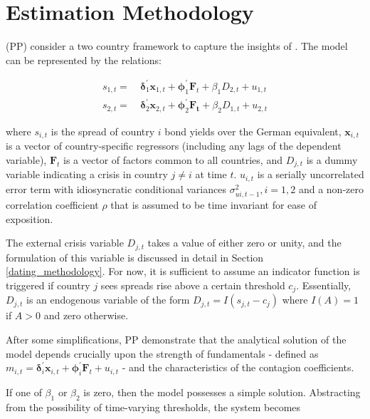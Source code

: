\documentclass[../base.tex]{subfiles}
\begin{document}
\section{Estimation Methodology}
\label{est}

\cite{pesaran2007econometric} (PP) consider a two country framework to capture the insights of \cite{masson1999contagion}. The model can be represented by the relations:

\begin{align} 
	s_{1,t} =&~\boldsymbol{\delta}_1^{\prime} \mathbf{x}_{1,t} + \boldsymbol{\phi}_1^{\prime} \mathbf{F}_t + \beta_1 D_{2,t} + u_{1,t} \label{eqn:system}\\
	s_{2,t} =&~\boldsymbol{\delta}_2^{\prime} \mathbf{x}_{2,t} + \boldsymbol{\phi}_2^{\prime} \mathbf{F_t} + \beta_2 D_{1,t} + u_{2,t} \label{eqn:system2}
\end{align}

where $s_{i,t}$ is the spread of country $i$ bond yields over the German equivalent, $\mathbf{x}_{i,t}$ is a vector of country-specific regressors (including any lags of the dependent variable), $\mathbf{F}_t$ is a vector of factors common to all countries, and $D_{j, t}$ is a dummy variable indicating a crisis in country $j \neq i$ at time $t$. $u_{i, t}$ is a serially uncorrelated error term with idiosyncratic conditional variances $\sigma^2_{ui, t-1}, i = 1, 2$ and a non-zero correlation coefficient $\rho$ that is assumed to be time invariant for ease of exposition. 

The external crisis variable $D_{j, t}$ takes a value of either zero or unity, and the formulation of this variable is discussed in detail in Section \ref{dating_methodology}. For now, it is sufficient to assume an indicator function is triggered if country $j$ sees spreads rise above a certain threshold $c_j$. Essentially, $D_{j,t}$ is an endogenous variable of the form $D_{j, t} = I(s_{j, t} - c_j)$ where $I(A) = 1$ if $A >0$ and zero otherwise.

After some simplifications, PP demonstrate that the analytical solution of the model depends crucially upon the strength of fundamentals - defined as $m_{i,t} = \boldsymbol{\delta}_i^{\prime} \mathbf{x}_{i,t} + \boldsymbol{\phi}_i^{\prime} \mathbf{F}_t + u_{i,t}$ - and the characteristics of the contagion coefficients. 

If one of $\beta_1$ or $\beta_2$ is zero, then the model possesses a simple solution. Abstracting from the possibility of time-varying thresholds, the system becomes
\end{document}
